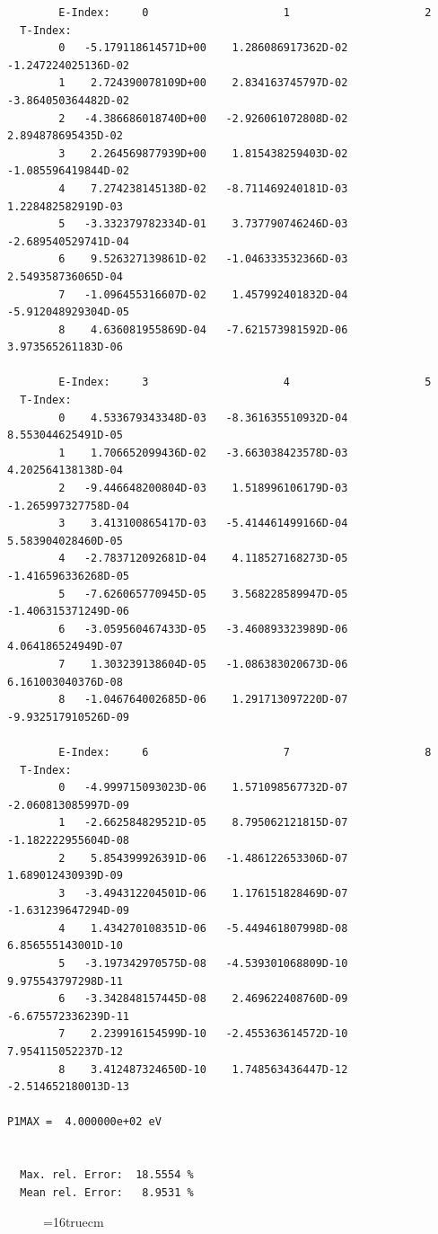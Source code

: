 \documentclass[12pt,dvipdfmx]{article}
\begin{document}
\begin{small}\begin{verbatim}
        E-Index:     0                     1                     2
  T-Index:
        0   -5.179118614571D+00    1.286086917362D-02   -1.247224025136D-02
        1    2.724390078109D+00    2.834163745797D-02   -3.864050364482D-02
        2   -4.386686018740D+00   -2.926061072808D-02    2.894878695435D-02
        3    2.264569877939D+00    1.815438259403D-02   -1.085596419844D-02
        4    7.274238145138D-02   -8.711469240181D-03    1.228482582919D-03
        5   -3.332379782334D-01    3.737790746246D-03   -2.689540529741D-04
        6    9.526327139861D-02   -1.046333532366D-03    2.549358736065D-04
        7   -1.096455316607D-02    1.457992401832D-04   -5.912048929304D-05
        8    4.636081955869D-04   -7.621573981592D-06    3.973565261183D-06

        E-Index:     3                     4                     5
  T-Index:
        0    4.533679343348D-03   -8.361635510932D-04    8.553044625491D-05
        1    1.706652099436D-02   -3.663038423578D-03    4.202564138138D-04
        2   -9.446648200804D-03    1.518996106179D-03   -1.265997327758D-04
        3    3.413100865417D-03   -5.414461499166D-04    5.583904028460D-05
        4   -2.783712092681D-04    4.118527168273D-05   -1.416596336268D-05
        5   -7.626065770945D-05    3.568228589947D-05   -1.406315371249D-06
        6   -3.059560467433D-05   -3.460893323989D-06    4.064186524949D-07
        7    1.303239138604D-05   -1.086383020673D-06    6.161003040376D-08
        8   -1.046764002685D-06    1.291713097220D-07   -9.932517910526D-09

        E-Index:     6                     7                     8
  T-Index:
        0   -4.999715093023D-06    1.571098567732D-07   -2.060813085997D-09
        1   -2.662584829521D-05    8.795062121815D-07   -1.182222955604D-08
        2    5.854399926391D-06   -1.486122653306D-07    1.689012430939D-09
        3   -3.494312204501D-06    1.176151828469D-07   -1.631239647294D-09
        4    1.434270108351D-06   -5.449461807998D-08    6.856555143001D-10
        5   -3.197342970575D-08   -4.539301068809D-10    9.975543797298D-11
        6   -3.342848157445D-08    2.469622408760D-09   -6.675572336239D-11
        7    2.239916154599D-10   -2.455363614572D-10    7.954115052237D-12
        8    3.412487324650D-10    1.748563436447D-12   -2.514652180013D-13

P1MAX =  4.000000e+02 eV


  Max. rel. Error:  18.5554 %
  Mean rel. Error:   8.9531 %

\end{verbatim}\end{small}
\begin{figure} \label{2.0c}
\epsfxsize=16truecm
\end{figure}
\newpage
\end{document}
